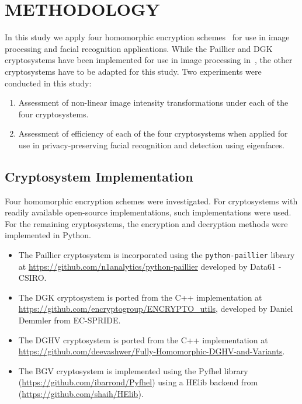 \chapter{METHODOLOGY}

In this study we apply four homomorphic encryption schemes~\cite{ziad_cryptoimg:_2016, pieprzyk_efficient_2007, dasgupta_design_2016, garay_algorithms_2014} for use in image processing and facial recognition applications.
While the Paillier and DGK cryptosystems have been implemented for use in image processing in~\cite{ziad_cryptoimg:_2016, hutchison_privacy-preserving_2009}, the other cryptosystems have to be adapted for this study.
Two experiments were conducted in this study:
\begin{enumerate}
	\item Assessment of non-linear image intensity transformations under each of the four cryptosystems.
	\item Assessment of efficiency of each of the four cryptosystems when applied for use in privacy-preserving facial recognition and detection using eigenfaces.
\end{enumerate}

\section{Cryptosystem Implementation}

Four homomorphic encryption schemes were investigated. For cryptosystems with readily available open-source implementations, such implementations were used. For the remaining cryptosystems, the encryption and decryption methods were implemented in Python.
\begin{itemize}
	\item The Paillier cryptosystem is incorporated using the \texttt{python-paillier} library at \url{https://github.com/n1analytics/python-paillier} developed by Data61 - CSIRO.
	\item The DGK cryptosystem is ported from the C++ implementation at \url{https://github.com/encryptogroup/ENCRYPTO_utils}, developed by Daniel Demmler from EC-SPRIDE.
	\item The DGHV cryptosystem is ported from the C++ implementation at 
	\url{https://github.com/deevashwer/Fully-Homomorphic-DGHV-and-Variants}.
	\item The BGV cryptosystem is implemented using the Pyfhel library (\url{https://github.com/ibarrond/Pyfhel}) using a HElib backend from (\url{https://github.com/shaih/HElib}).
\end{itemize}

